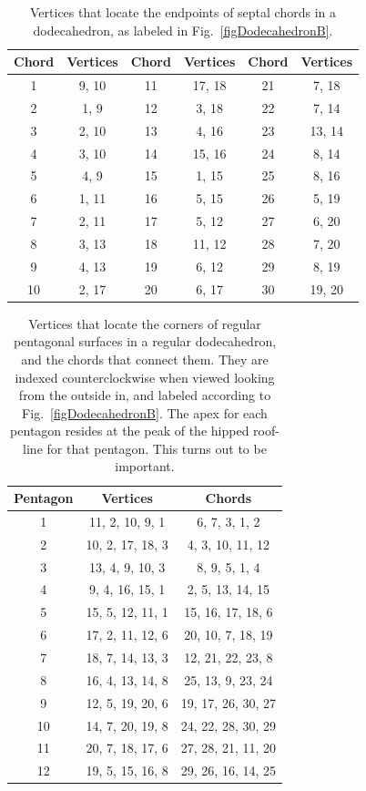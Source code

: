 \begin{table}
	\begin{center}
	\begin{tabular}{|c|c||c|c||c|c|}
		\hline
		Chord & Vertices & Chord & Vertices & Chord & Vertices \\ \hline
		1 & 9, 10 & 11 & 17, 18 & 21 & 7, 18 \\
		2 & 1, 9 & 12 & 3, 18 & 22 & 7, 14 \\
		3 & 2, 10 & 13 & 4, 16 & 23 & 13, 14 \\
		4 & 3, 10 & 14 & 15, 16 & 24 & 8, 14 \\
		5 & 4, 9 & 15 & 1, 15 & 25 & 8, 16 \\
		6 & 1, 11 & 16 & 5, 15 & 26 & 5, 19 \\
		7 & 2, 11 & 17 & 5, 12 & 27 & 6, 20 \\
		8 & 3, 13 & 18 & 11, 12 & 28 & 7, 20 \\
		9 & 4, 13 & 19 & 6, 12 & 29 & 8, 19 \\
		10 & 2, 17 & 20 & 6, 17 & 30 & 19, 20 \\
		\hline
	\end{tabular}
	\end{center}
	\caption{Vertices that locate the endpoints of septal chords in a dodecahedron, as labeled in Fig.~\ref{figDodecahedronB}.}
	\label{Tablechordae}
\end{table}

\begin{table}
	\begin{center}
	\begin{tabular}{|c|c|c|}
		\hline
		Pentagon & Vertices & Chords \\ \hline
		1 & 11, 2, 10, 9, 1 & 6, 7, 3, 1, 2 \\
		2 & 10, 2, 17, 18, 3 & 4, 3, 10, 11, 12 \\
		3 & 13, 4, 9, 10, 3 & 8, 9, 5, 1, 4 \\
		4 & 9, 4, 16, 15, 1 & 2, 5, 13, 14, 15 \\
		5 & 15, 5, 12, 11, 1 & 15, 16, 17, 18, 6 \\
		6 & 17, 2, 11, 12, 6 & 20, 10, 7, 18, 19 \\
		7 & 18, 7, 14, 13, 3 & 12, 21, 22, 23, 8 \\
		8 & 16, 4, 13, 14, 8 & 25, 13, 9, 23, 24 \\
		9 & 12, 5, 19, 20, 6 & 19, 17, 26, 30, 27 \\
		10 & 14, 7, 20, 19, 8 & 24, 22, 28, 30, 29 \\
		11 & 20, 7, 18, 17, 6 & 27, 28, 21, 11, 20 \\
		12 & 19, 5, 15, 16, 8 & 29, 26, 16, 14, 25 \\
		\hline
	\end{tabular}
	\end{center}
	\caption{Vertices that locate the corners of regular pentagonal surfaces in a regular dodecahedron, and the chords that connect them.  They are indexed counterclockwise when viewed looking from the outside in, and labeled according to Fig.~\ref{figDodecahedronB}.  The apex for each pentagon resides at the peak of the hipped roof-line for that pentagon.  This turns out to be important.} 
	\label{TablePentagons}
\end{table}

